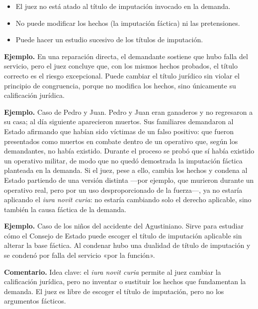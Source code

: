 \begin{itemize}
\item El juez no está atado al título de imputación invocado en la demanda.
\item No puede modificar los hechos (la imputación fáctica) ni las pretensiones.
\item Puede hacer un estudio sucesivo de los títulos de imputación.
\end{itemize}
\begin{ejemplo}
\textcolor[HTML]{4F6228}{\textbf{Ejemplo. }}En una reparación directa, el demandante sostiene que hubo falla del servicio, pero el juez concluye que, con los mismos hechos probados, el título correcto es el riesgo excepcional. Puede cambiar el título jurídico sin violar el principio de congruencia, porque no modifica los hechos, sino únicamente su calificación jurídica.
\par
\textcolor[HTML]{4F6228}{\textbf{Ejemplo. }}Caso de Pedro y Juan. Pedro y Juan eran ganaderos y no regresaron a su casa; al día siguiente aparecieron muertos. Sus familiares demandaron al Estado afirmando que habían sido víctimas de un falso positivo: que fueron presentados como muertos en combate dentro de un operativo que, según los demandantes, no había existido. Durante el proceso se probó que sí había existido un operativo militar, de modo que no quedó demostrada la imputación fáctica planteada en la demanda. Si el juez, pese a ello, cambia los hechos y condena al Estado partiendo de una versión distinta —por ejemplo, que murieron durante un operativo real, pero por un uso desproporcionado de la fuerza—, ya no estaría aplicando el \textit{iura novit curia}: no estaría cambiando solo el derecho aplicable, sino también la causa fáctica de la demanda.
\par
\textcolor[HTML]{4F6228}{\textbf{Ejemplo. }}Caso de los niños del accidente del Agustiniano. Sirve para estudiar cómo el Consejo de Estado puede escoger el título de imputación aplicable sin alterar la base fáctica. Al condenar hubo una dualidad de título de imputación y se condenó por falla del servicio «por la función».
\end{ejemplo}
\begin{comentario}
\textcolor[HTML]{8A6D3B}{\textbf{Comentario. }}Idea clave: el \textit{iura novit curia} permite al juez cambiar la calificación jurídica, pero no inventar o sustituir los hechos que fundamentan la demanda. El juez es libre de escoger el título de imputación, pero no los argumentos fácticos.
\end{comentario}
